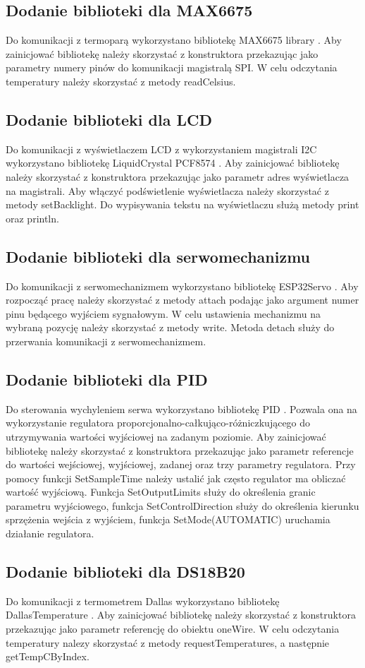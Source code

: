 \documentclass[11pt]{report}
\begin{document}
 \subsection{Dodanie biblioteki dla MAX6675}
 Do komunikacji z termoparą wykorzystano bibliotekę MAX6675 library \cite{MAX6675library}. Aby zainicjować bibliotekę należy skorzystać z konstruktora przekazując jako parametry numery pinów do komunikacji magistralą SPI.
 W celu odczytania temperatury należy skorzystać z metody readCelsius.
 \subsection{Dodanie biblioteki dla LCD}
 Do komunikacji z wyświetlaczem LCD z wykorzystaniem magistrali I2C wykorzystano bibliotekę LiquidCrystal PCF8574 \cite{LCDlibrary}. Aby zainicjować bibliotekę należy skorzystać z konstruktora przekazując jako parametr adres wyświetlacza na magistrali. Aby włączyć podświetlenie wyświetlacza należy skorzystać z metody setBacklight. Do wypisywania tekstu na wyświetlaczu służą metody print oraz println.
 \subsection{Dodanie biblioteki dla serwomechanizmu}
 Do komunikacji z serwomechanizmem wykorzystano bibliotekę ESP32Servo \cite{Servolibrary}. Aby rozpocząć pracę należy skorzystać z metody attach podając jako argument numer pinu będącego wyjściem sygnałowym. W celu ustawienia mechanizmu na wybraną pozycję należy skorzystać z metody write. Metoda detach służy do przerwania komunikacji z serwomechanizmem.
 \subsection{Dodanie biblioteki dla PID}
 Do sterowania wychyleniem serwa wykorzystano bibliotekę PID \cite{PIDlibrary}. Pozwala ona na wykorzystanie regulatora proporcjonalno-całkująco-różniczkującego do utrzymywania wartości wyjściowej na zadanym poziomie.
 Aby zainicjować bibliotekę  należy skorzystać z konstruktora przekazując jako parametr referencje do wartości wejściowej, wyjściowej, zadanej oraz trzy parametry regulatora. Przy pomocy funkcji SetSampleTime należy ustalić jak często regulator ma obliczać wartość wyjściową. Funkcja SetOutputLimits służy do określenia granic parametru wyjściowego, funkcja SetControlDirection służy do określenia kierunku sprzężenia wejścia z wyjściem, funkcja SetMode(AUTOMATIC) uruchamia działanie regulatora.
 \subsection{Dodanie biblioteki dla DS18B20}
 Do komunikacji z termometrem Dallas wykorzystano bibliotekę DallasTemperature \cite{dallaslibrary}. Aby zainicjować bibliotekę należy skorzystać z konstruktora przekazując jako parametr referencję do obiektu oneWire. W celu odczytania temperatury nalezy skorzystać z metody requestTemperatures, a następnie getTempCByIndex.
\end{document}
